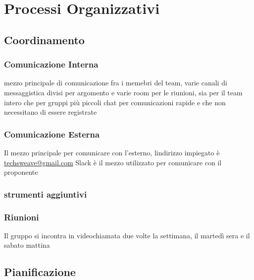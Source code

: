 \section{Processi Organizzativi}
\subsection{Coordinamento}
\subsubsection{Comunicazione Interna}
mezzo principale di comunicazione fra i memebri del team, varie canali di messaggistica divisi per argomento e varie room per le riunioni, sia per il team intero che per gruppi pi\`u piccoli
chat per comunicazioni rapide e che non necessitano di essere registrate
\subsubsection{Comunicazione Esterna}
Il mezzo principale per comunicare con l'esterno, lindirizzo impiegato \`e 
\href{mailto:techsweave@gmail.com}{techsweave@gmail.com}
Slack \`e il mezzo utilizzato per comunicare con il proponente
\subsubsection{strumenti aggiuntivi}
\subsubsection{Riunioni}
Il gruppo si incontra in videochiamata due volte la settimana, il marted\`i sera e il sabato mattina
\subsection{Pianificazione}
